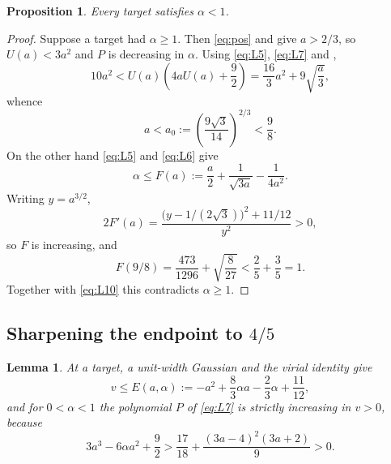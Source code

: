 \documentclass[11pt,reqno]{amsart}
\theoremstyle{plain}
\newtheorem{lemma}[theorem]{Lemma}
\newtheorem{proposition}[theorem]{Proposition}
\theoremstyle{definition}
\theoremstyle{remark}
\numberwithin{equation}{section}
\begin{document}
\begin{proposition}
  \label{prop:below-one}
  Every target satisfies $\alpha<1$.
\end{proposition}

\begin{proof}
  Suppose a target had $\alpha\ge1$. Then \eqref{eq:pos} and
   give $a>2/3$, so $U(a)<3a^2$ and $P$ is
  decreasing in $\alpha$. Using \eqref{eq:L5}, \eqref{eq:L7} and
  ,
  \begin{equation*}
    10a^2<U(a)\left(4aU(a)+\frac92\right)
    =\frac{16}{3}a^2+9\sqrt{\frac a3},
  \end{equation*}
  whence
  \begin{equation}
    \label{eq:L10}
    a<a_0:=\left(\frac{9\sqrt3}{14}\right)^{2/3}<\frac98 .
  \end{equation}
  On the other hand \eqref{eq:L5} and \eqref{eq:L6} give
  \begin{equation}
    \label{eq:L11}
    \alpha\le F(a):=\frac a2+\frac1{\sqrt{3a}}-\frac1{4a^2}.
  \end{equation}
  Writing $y=a^{3/2}$,
  \begin{equation*}
    2F'(a)=\frac{\bigl(y-1/(2\sqrt3)\bigr)^2+11/12}{y^2}>0,
  \end{equation*}
  so $F$ is increasing, and
  \begin{equation*}
    F(9/8)=\frac{473}{1296}+\sqrt{\frac8{27}}<\frac25+\frac35=1 .
  \end{equation*}
  Together with \eqref{eq:L10} this contradicts $\alpha\ge1$.
\end{proof}

\subsection{Sharpening the endpoint to \texorpdfstring{$4/5$}{4/5}}

\begin{lemma}
  \label{lem:L12}
  At a target, a unit-width Gaussian and the virial identity give
  \begin{equation}
    \label{eq:L12}
    v\le E(a,\alpha):=-a^2+\frac83\alpha a-\frac23\alpha+\frac{11}{12},
  \end{equation}
  and for $0<\alpha<1$ the polynomial $P$ of \eqref{eq:L7} is strictly
  increasing in $v>0$, because
  \begin{equation}
    \label{eq:L13}
    3a^3-6\alpha a^2+\frac92>\frac{17}{18}+\frac{(3a-4)^2(3a+2)}9>0 .
  \end{equation}
\end{lemma}
\end{document}
